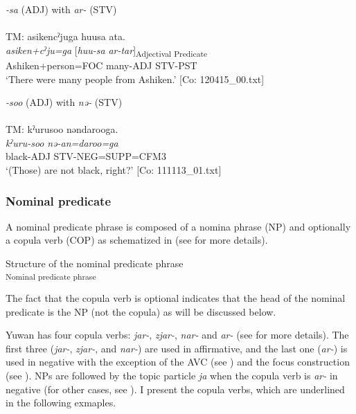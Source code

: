 \ea  \label{ex:4.11}
 \ea \textit{{}-sa} (ADJ) with \textit{ar-} (STV) \label{ex:4.11a}\\\\
\glll  TM:  asikencˀjuga  huusa  ata.\\
    \textit{asiken+cˀju=ga}  [\textit{huu-sa}  \textit{ar{}-tar}]\textsubscript{Adjectival Predicate}\\
    Ashiken+person=FOC  many-ADJ  STV-PST\\
    \glt     ‘There were many people from Ashiken.’ [Co: 120415\_00.txt]

 \ex\textit{{}-soo} (ADJ) with \textit{nə-} (STV)\\\\
\glll  TM:  kˀurusoo  nəndarooga.\\
    \textit{kˀuru-soo}  \textit{nə{}-an=daroo=ga}\\
    black-ADJ  STV-NEG=SUPP=CFM3\\
    \glt     ‘(Those) are not black, right?’ [Co: 111113\_01.txt]
    \z
\z

\subsubsection{Nominal predicate}\label{sec:4.1.3.3}

A nominal predicate phrase is composed of a nomina phrase (NP) and optionally a copula verb (COP) as schematized in  (see  for more details).

\ea  Structure of the nominal predicate phrase \label{ex:4.12}\\\textsubscript{Nominal predicate phrase}
\z

The fact that the copula verb is optional indicates that the head of the nominal predicate is the NP (not the copula) as will be discussed below.

Yuwan has four copula verbs: \textit{jar-}, \textit{zjar-}, \textit{nar-} and \textit{ar-} (see  for more details). The first three (\textit{jar-}, \textit{zjar-}, and \textit{nar-}) are used in affirmative, and the last one (\textit{ar-}) is used in negative with the exception of the AVC (see ) and the focus construction (see ). NPs are followed by the topic particle \textit{ja} when the copula verb is \textit{ar-} in negative (for other cases, see ). I present the copula verbs, which are underlined in the following exmaples.

